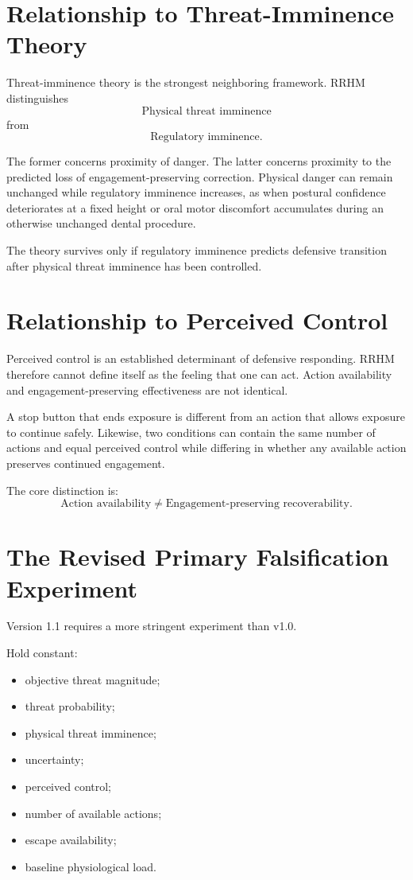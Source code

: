 \documentclass[11pt]{article}
\begin{document}
\section{Relationship to Threat-Imminence Theory}

Threat-imminence theory is the strongest neighboring framework. RRHM distinguishes
\[
\text{Physical threat imminence}
\]
from
\[
\text{Regulatory imminence}.
\]

The former concerns proximity of danger. The latter concerns proximity to the predicted loss of engagement-preserving correction. Physical danger can remain unchanged while regulatory imminence increases, as when postural confidence deteriorates at a fixed height or oral motor discomfort accumulates during an otherwise unchanged dental procedure.

The theory survives only if regulatory imminence predicts defensive transition after physical threat imminence has been controlled.

\section{Relationship to Perceived Control}

Perceived control is an established determinant of defensive responding. RRHM therefore cannot define itself as the feeling that one can act. Action availability and engagement-preserving effectiveness are not identical.

A stop button that ends exposure is different from an action that allows exposure to continue safely. Likewise, two conditions can contain the same number of actions and equal perceived control while differing in whether any available action preserves continued engagement.

The core distinction is:
\[
\boxed{\text{Action availability}\neq\text{Engagement-preserving recoverability}.}
\]

\section{The Revised Primary Falsification Experiment}

Version 1.1 requires a more stringent experiment than v1.0.

Hold constant:
\begin{itemize}[leftmargin=*]
\item objective threat magnitude;
\item threat probability;
\item physical threat imminence;
\item uncertainty;
\item perceived control;
\item number of available actions;
\item escape availability;
\item baseline physiological load.
\end{itemize}
\end{document}
